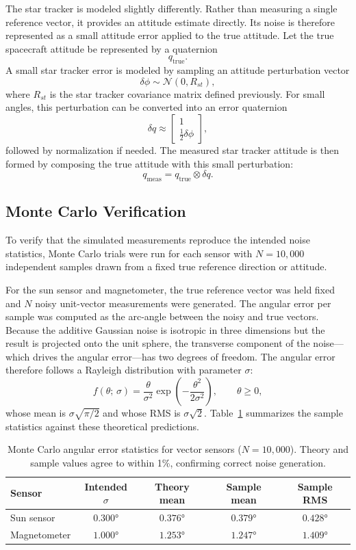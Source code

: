 \documentclass[12pt]{article}
\begin{document}
The star tracker is modeled slightly differently. Rather than measuring a single reference vector, it provides an attitude estimate directly. Its noise is therefore represented as a small attitude error applied to the true attitude. Let the true spacecraft attitude be represented by a quaternion
\[
q_{\text{true}}.
\]
A small star tracker error is modeled by sampling an attitude perturbation vector
\[
\delta\phi \sim \mathcal{N}(0,R_{st}),
\]
where \(R_{st}\) is the star tracker covariance matrix defined previously. For small angles, this perturbation can be converted into an error quaternion
\[
\delta q \approx
\begin{bmatrix}
1 \\
\tfrac{1}{2}\delta\phi
\end{bmatrix},
\]
followed by normalization if needed. The measured star tracker attitude is then formed by composing the true attitude with this small perturbation:
\[
q_{\text{meas}} = q_{\text{true}} \otimes \delta q.
\]

\subsection{Monte Carlo Verification}

To verify that the simulated measurements reproduce the intended noise statistics, Monte Carlo trials were run for each sensor with $N = 10{,}000$ independent samples drawn from a fixed true reference direction or attitude.

For the sun sensor and magnetometer, the true reference vector was held fixed and $N$ noisy unit-vector measurements were generated. The angular error per sample was computed as the arc-angle between the noisy and true vectors. Because the additive Gaussian noise is isotropic in three dimensions but the result is projected onto the unit sphere, the transverse component of the noise—which drives the angular error—has two degrees of freedom. The angular error therefore follows a Rayleigh distribution with parameter $\sigma$:
\[
f(\theta;\,\sigma)
= \frac{\theta}{\sigma^2}\exp\!\left(-\frac{\theta^2}{2\sigma^2}\right),
\qquad \theta \geq 0,
\]
whose mean is $\sigma\sqrt{\pi/2}$ and whose RMS is $\sigma\sqrt{2}$. Table~\ref{tab:sec3_mc} summarizes the sample statistics against these theoretical predictions.

\begin{table}[H]
\centering
\begin{tabular}{lcccc}
\hline
\textbf{Sensor} & \textbf{Intended }$\sigma$ & \textbf{Theory mean} & \textbf{Sample mean} & \textbf{Sample RMS} \\
\hline
Sun sensor     & $0.300$° & $0.376$° & $0.379$° & $0.428$° \\
Magnetometer   & $1.000$° & $1.253$° & $1.247$° & $1.409$° \\
\hline
\end{tabular}
\caption{Monte Carlo angular error statistics for vector sensors ($N=10{,}000$). Theory and sample values agree to within 1\%, confirming correct noise generation.}
\label{tab:sec3_mc}
\end{table}
\end{document}
